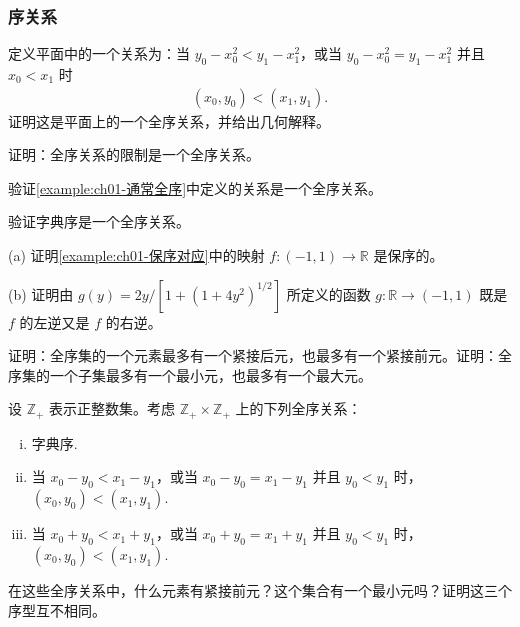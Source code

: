 \documentclass[../../main.tex]{subfiles}
\begin{document}
\subsubsection*{序关系}

\begin{exercise}\label{exercise:ch01-关系-6}
定义平面中的一个关系为：当 $y_{0} - x_{0}^{2} < y_{1} - x_{1}^{2}$，或当 $y_{0} - x_{0}^{2} = y_{1} - x_{1}^{2}$ 并且 $x_{0} < x_{1}$ 时
\begin{align*}
(x_{0}, y_{0}) < (x_{1}, y_{1}).
\end{align*}
证明这是平面上的一个全序关系，并给出几何解释。
\end{exercise}

\begin{exercise}\label{exercise:ch01-关系-7}
证明：全序关系的限制是一个全序关系。
\end{exercise}

\begin{exercise}\label{exercise:ch01-关系-8}
验证\cref{example:ch01-通常全序}中定义的关系是一个全序关系。
\end{exercise}

\begin{exercise}\label{exercise:ch01-关系-9}
验证字典序是一个全序关系。
\end{exercise}

\begin{exercise}\label{exercise:ch01-关系-10}
(a) 证明\cref{example:ch01-保序对应}中的映射 $f: (-1, 1) \longrightarrow \mathbb{R}$ 是保序的。

(b) 证明由 $g(y) = 2y / [1 + (1 + 4y^{2})^{1/2}]$ 所定义的函数 $g: \mathbb{R} \longrightarrow (-1, 1)$ 既是 $f$ 的左逆又是 $f$ 的右逆。
\end{exercise}

\begin{exercise}\label{exercise:ch01-关系-11}
证明：全序集的一个元素最多有一个紧接后元，也最多有一个紧接前元。证明：全序集的一个子集最多有一个最小元，也最多有一个最大元。
\end{exercise}

\begin{exercise}\label{exercise:ch01-关系-12}
设 $\mathbb{Z}_{+}$ 表示正整数集。考虑 $\mathbb{Z}_{+} \times \mathbb{Z}_{+}$ 上的下列全序关系：
\begin{enumerate}[(i)]
\item 字典序.
\item 当 $x_{0} - y_{0} < x_{1} - y_{1}$，或当 $x_{0} - y_{0} = x_{1} - y_{1}$ 并且 $y_{0} < y_{1}$ 时，$(x_{0}, y_{0}) < (x_{1}, y_{1})$.
\item 当 $x_{0} + y_{0} < x_{1} + y_{1}$，或当 $x_{0} + y_{0} = x_{1} + y_{1}$ 并且 $y_{0} < y_{1}$ 时，$(x_{0}, y_{0}) < (x_{1}, y_{1})$.
\end{enumerate}
在这些全序关系中，什么元素有紧接前元？这个集合有一个最小元吗？证明这三个序型互不相同。
\end{exercise}
\end{document}
